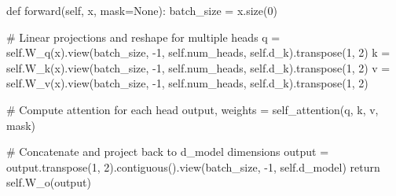\begin{pythoncode}
    def forward(self, x, mask=None):
        batch_size = x.size(0)
        
        # Linear projections and reshape for multiple heads
        q = self.W_q(x).view(batch_size, -1, self.num_heads, self.d_k).transpose(1, 2)
        k = self.W_k(x).view(batch_size, -1, self.num_heads, self.d_k).transpose(1, 2)
        v = self.W_v(x).view(batch_size, -1, self.num_heads, self.d_k).transpose(1, 2)
        
        # Compute attention for each head
        output, weights = self_attention(q, k, v, mask)
        
        # Concatenate and project back to d_model dimensions
        output = output.transpose(1, 2).contiguous().view(batch_size, -1, self.d_model)
        return self.W_o(output)
\end{pythoncode}

